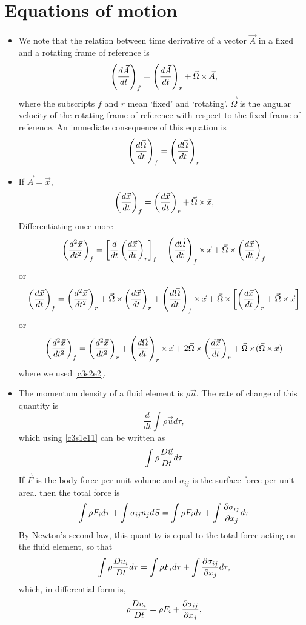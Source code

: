 \section{Equations of motion}\label{c3s2}
\begin{itemize}
\item We note that the relation between time derivative of a vector $\vec{A}$ in a fixed and a rotating frame of reference is
\begin{equation}\label{c3s2e1}
\left(\frac{d{\vec{A}}}{d{t}}\right)_f = \left(\frac{d{\vec{A}}}{d{t}}\right)_r + \vec{\Omega} \operatorname{\times} \vec{A},
\end{equation}
where the subscripts $f$ and $r$ mean \enquote*{fixed} and \enquote*{rotating}. $\vec{\Omega}$ is the angular velocity of the rotating frame of reference with respect to the fixed 
frame of reference. An immediate consequence of this equation is 
\begin{equation}\label{c3s2e2}
\left(\frac{d{\vec{\Omega}}}{d{t}}\right)_f = \left(\frac{d{\vec{\Omega}}}{d{t}}\right)_r
\end{equation}

\item If $\vec{A} = \vec{x}$,
\[
\left(\frac{d{\vec{x}}}{d{t}}\right)_f = \left(\frac{d{\vec{x}}}{d{t}}\right)_r + \vec{\Omega} \operatorname{\times} \vec{x},
\]
Differentiating once more
\[
\left(\frac{d^2\vec{x}}{dt^2}\right)_f = \left[\frac{d}{dt}\left(\frac{d{\vec{x}}}{d{t}}\right)_r\right]_f + \left(\frac{d{\vec{\Omega}}}{d{t}}\right)_f\operatorname{\times}\vec{x} + 
\vec{\Omega}\operatorname{\times}\left(\frac{d{\vec{x}}}{d{t}}\right)_f 
\]
or
\[
\left(\frac{d{\vec{x}}}{d{t}}\right)_f = \left(\frac{d^2\vec{x}}{dt^2}\right)_r + \vec{\Omega}\operatorname{\times}\left(\frac{d{\vec{x}}}{d{t}}\right)_r + \left(\frac{d{\vec{\Omega}}}{d{t}}\right)_f \operatorname{\times} \vec{x} + 
\vec{\Omega}\operatorname{\times}\left[\left(\frac{d{\vec{x}}}{d{t}}\right)_r + \vec{\Omega} \operatorname{\times} \vec{x}\right] 
\]
or
\begin{equation}\label{c3s2e3}
\left(\frac{d^2\vec{x}}{dt^2}\right)_f = \left(\frac{d^2\vec{x}}{dt^2}\right)_r + \left(\frac{d{\vec{\Omega}}}{d{t}}\right)_r \operatorname{\times} \vec{x} + 2\vec{\Omega}\operatorname{\times}\left(\frac{d{\vec{x}}}{d{t}}\right)_r
+ \vec{\Omega}\operatorname{\times}(\vec{\Omega} \operatorname{\times} \vec{x})
\end{equation}
where we used \eqref{c3s2e2}.

\item The momentum density of a fluid element is $\rho\vec{u}$. The rate of change of this quantity is
\[
\frac{d}{dt}\int\rho\vec{u}d\tau,
\]
which using \eqref{c3s1e11} can be written as
\[
\int \rho\frac{D{\vec{u}}}{Dt}d\tau
\]
If $\vec{F}$ is the body force per unit volume and $\sigma_{ij}$ is the surface force
per unit area. then the total force is
\[
\int\rho F_i d\tau + \int\sigma_{ij}n_j dS = \int\rho F_i d\tau + \int\frac{\partial{\sigma_{ij}}}{\partial{x_j}} d\tau
\]
By Newton's second law, this quantity is equal to the total force acting on the fluid element, so that
\begin{equation}\label{c3s2e4}
\int \rho\frac{D{u_i}}{Dt}d\tau = \int\rho F_i d\tau + \int\frac{\partial{\sigma_{ij}}}{\partial{x_j}} d\tau,
\end{equation}
which, in differential form is,
\begin{equation}\label{c3s2e5}
\rho\frac{D{u_i}}{Dt} = \rho F_i + \frac{\partial{\sigma_{ij}}}{\partial{x_j}},
\end{equation}


\end{itemize}

